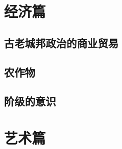 \documentclass[UTF8,12pt,draft]{ctexbook}
\begin{document}
\part{经济篇}
    \chapter{古老城邦政治的商业贸易}

    \chapter{农作物}

    \chapter{阶级的意识}

\part{艺术篇}
\end{document}
